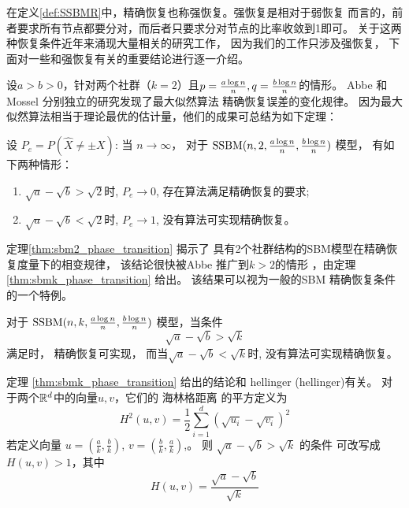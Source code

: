 在定义\ref{def:SSBMR}中，精确恢复也称强恢复。强恢复是相对于弱恢复
而言的，前者要求所有节点都要分对，而后者只要求分对节点的比率收敛到1即可。
关于这两种恢复条件近年来涌现大量相关的研究工作，
因为我们的工作只涉及强恢复，
下面对一些和强恢复有关的重要结论进行逐一介绍。

设$a>b>0$，针对两个社群（$k=2$）且$p=\frac{a \log n}{n},q=\frac{b \log n}{n}$的情形。
Abbe \cite{abbe2015exact} 和 Mossel
\cite{mossel2016} 分别独立的研究发现了最大似然算法
精确恢复误差的变化规律。
因为最大似然算法相当于理论最优的估计量，他们的成果可总结为如下定理：
\begin{theorem}\label{thm:sbm2_phase_transition}
设 $P_e=P(\hat{X} \neq \pm X)$: 当 $n \to \infty$，
对于 $\operatorname{SSBM}(n,2,\frac{a \log n}{n}, \frac{b \log n}{n})$ 模型，
有如下两种情形：
	\begin{enumerate}
		\item $\sqrt{a} - \sqrt{b} > \sqrt{2}$时,
    $P_e \to 0$, 存在算法满足精确恢复的要求;
		\item $\sqrt{a} - \sqrt{b} < \sqrt{2}$时,
    $P_e \to 1$, 没有算法可实现精确恢复。
	\end{enumerate}
\end{theorem}
定理\ref{thm:sbm2_phase_transition} 揭示了
具有2个社群结构的SBM模型在精确恢复度量下的相变规律，
该结论很快被Abbe 推广到$k>2$的情形
\cite{abbe2015community}，由定理
\ref{thm:sbmk_phase_transition} 给出。
该结果可以视为一般的SBM
精确恢复条件的一个特例。

\begin{theorem}\label{thm:sbmk_phase_transition}
  对于 $\operatorname{SSBM}(n,k,\frac{a \log n}{n}, \frac{b \log n}{n})$ 模型，当条件
  \begin{equation}\label{eq:abk}
    \sqrt{a} - \sqrt{b} > \sqrt{k}
  \end{equation}   
  满足时，
  精确恢复可实现，
  而当$\sqrt{a} - \sqrt{b} < \sqrt{k}$时,
  没有算法可实现精确恢复。
\end{theorem}
\begin{remark}
  定理 \ref{thm:sbmk_phase_transition}
  给出的结论和 \gls{hellinger} (\glsdesc{hellinger})有关。
  对于两个$\mathbb{R}^d$中的向量$u,v$，它们的
  海林格距离 
  的平方定义为
  \begin{equation}
    H^2(u,v) = \frac{1}{2}
    \sum_{i=1}^d (\sqrt{u_i} - \sqrt{v_i})^2
  \end{equation}
  若定义向量 $u= (\frac{a}{k}, \frac{b}{k})$,
  $v =  (\frac{b}{k}, \frac{a}{k})$,。
  则
  $\sqrt{a} - \sqrt{b} > \sqrt{k}$ 的条件
  可改写成
  $H(u, v) > 1$，其中
  \begin{equation}\label{eq:Hellinger_abuv}
    H(u,v)=\frac{\sqrt{a} - \sqrt{b}}{\sqrt{k}}    
  \end{equation}
\end{remark}

